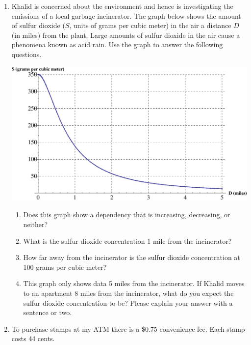 \documentclass[12pt]{article}
\begin{document}
\hrulefill


\newpage

\begin{enumerate}
\item Khalid is concerned about the environment and hence is investigating the emissions of a local garbage incinerator.  The graph below shows the amount of sulfur dioxide ($S$, units of grams per cubic meter) in the air a distance $D$ (in miles) from the plant. Large amounts of sulfur dioxide in the air cause a phenomena known as acid rain. Use the graph to answer the following questions.

\begin{center}
 {\includegraphics [width = 8in] {garbageEmissions_B}}
\end{center}



\begin{enumerate}
\item Does this graph show a dependency that is increasing, decreasing, or neither?
\vfill
\item What is the sulfur dioxide concentration 1 mile from the incinerator?
\vfill
\item How far away from the incinerator is the sulfur dioxide concentration at 100 grams per cubic meter?
\vfill
\item This graph only shows data 5 miles from the incinerator.  If Khalid moves to an apartment 8 miles from the incinerator, what do you expect the sulfur dioxide concentration to be?  Please explain your answer with a sentence or two.
\vfill
\end{enumerate}

\newpage
\item  To purchase stamps at my ATM there is a \$0.75 convenience fee.  Each stamp costs 44 cents.   


\end{enumerate}
\end{document}
